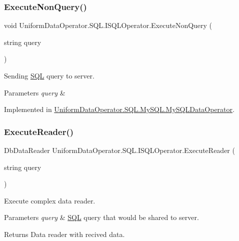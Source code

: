\subsubsection{\texorpdfstring{Execute\+Non\+Query()}{ExecuteNonQuery()}}
{\footnotesize\ttfamily void Uniform\+Data\+Operator.\+S\+Q\+L.\+I\+S\+Q\+L\+Operator.\+Execute\+Non\+Query (\begin{DoxyParamCaption}\item[{string}]{query }\end{DoxyParamCaption})}



Sending \mbox{\hyperlink{namespace_uniform_data_operator_1_1_s_q_l}{S\+QL}} query to server. 


\begin{DoxyParams}{Parameters}
{\em query} & \\
\hline
\end{DoxyParams}


Implemented in \mbox{\hyperlink{class_uniform_data_operator_1_1_s_q_l_1_1_my_s_q_l_1_1_my_s_q_l_data_operator_a9e565918b8328323520c6e059d8e3d1f}{Uniform\+Data\+Operator.\+S\+Q\+L.\+My\+S\+Q\+L.\+My\+S\+Q\+L\+Data\+Operator}}.

\mbox{\label{interface_uniform_data_operator_1_1_s_q_l_1_1_i_s_q_l_operator_a1f6dfa5dd14f7d52559b4e8f1ffda52e}} 
\subsubsection{\texorpdfstring{Execute\+Reader()}{ExecuteReader()}}
{\footnotesize\ttfamily Db\+Data\+Reader Uniform\+Data\+Operator.\+S\+Q\+L.\+I\+S\+Q\+L\+Operator.\+Execute\+Reader (\begin{DoxyParamCaption}\item[{string}]{query }\end{DoxyParamCaption})}



Execute complex data reader. 


\begin{DoxyParams}{Parameters}
{\em query} & \mbox{\hyperlink{namespace_uniform_data_operator_1_1_s_q_l}{S\+QL}} query that would be shared to server.\\
\hline
\end{DoxyParams}
\begin{DoxyReturn}{Returns}
Data reader with recived data.
\end{DoxyReturn}


